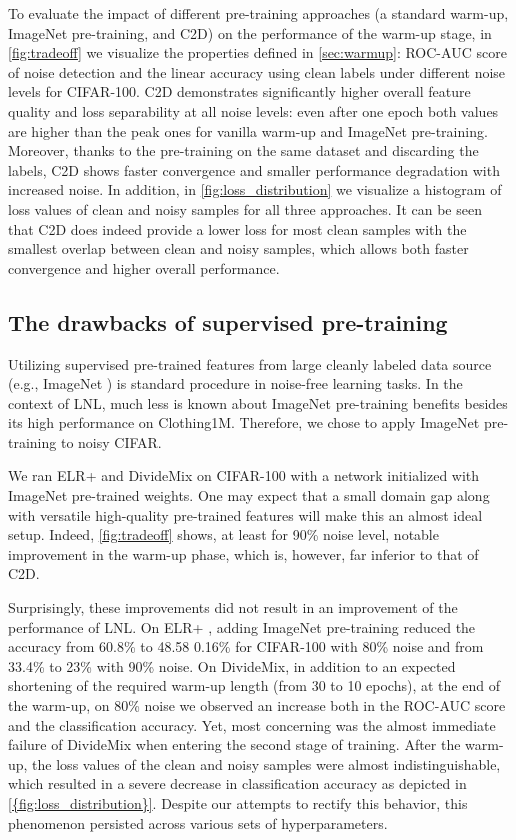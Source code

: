 \documentclass[10pt,twocolumn,letterpaper]{article}
\renewcommand{\cite}[1]{\citep{#1}}
\newcommand{\eb}[1]{{\scriptsize\,\,#1}}
\begin{document}
To evaluate the impact of different pre-training approaches (a standard warm-up, ImageNet pre-training, and C2D) on the performance of the warm-up stage,  in \cref{fig:tradeoff} we visualize the properties defined in \cref{sec:warmup}: ROC-AUC score of noise detection and the linear accuracy using clean labels under different noise levels for CIFAR-100. 
C2D demonstrates significantly higher overall feature quality and loss separability at all noise levels: even after one epoch both values are higher than the peak ones for vanilla warm-up and ImageNet pre-training. Moreover, thanks to the pre-training on the same dataset and discarding the labels, C2D shows faster convergence and smaller performance degradation with increased noise.
In addition,  in \cref{fig:loss_distribution} we visualize a histogram of loss values of clean and noisy samples for all three approaches. It can be seen that  C2D does indeed provide a lower loss for most clean samples with the smallest overlap between clean and noisy samples, which allows both faster convergence and higher overall performance.


\subsection{The drawbacks of supervised pre-training}
\label{subsec:super_comparison}



Utilizing supervised pre-trained features from large cleanly labeled data source (e.g., ImageNet \cite{alex2019bit}) is standard procedure in noise-free learning tasks. In the context of LNL, much less is known about ImageNet pre-training benefits besides its high performance on Clothing1M. Therefore,  we chose to apply ImageNet pre-training to noisy CIFAR.  


We ran ELR+ and DivideMix on CIFAR-100 with a network initialized with ImageNet pre-trained weights. 
One may expect that a small domain gap along with versatile high-quality pre-trained features will make this an almost ideal setup.  Indeed,  \cref{fig:tradeoff} shows, at least for 90\% noise level, notable improvement in the warm-up phase, which is, however, far inferior to that of C2D.

Surprisingly, these improvements did not result in an improvement of the performance of LNL.
On ELR+ \cite{liu2020earlylearning},  adding ImageNet pre-training reduced the accuracy from 60.8\% to 48.58\eb{0.16}\% for CIFAR-100 with 80\% noise and from 33.4\% to 23\% with 90\% noise.
On DivideMix, in addition to an expected shortening of the required warm-up length (from 30 to 10 epochs), at the end of the warm-up, on 80\% noise we observed an increase both in the ROC-AUC score 
and the classification accuracy. Yet, most concerning was the almost immediate failure of DivideMix when entering the second stage of training.
After the warm-up, the loss values of the clean and noisy samples were almost indistinguishable, which resulted in a severe decrease in classification accuracy as depicted in \cref{{fig:loss_distribution}}. Despite our attempts to rectify this behavior, this phenomenon persisted across various sets of hyperparameters.
\end{document}
